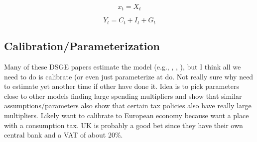 \documentclass[article,11pt,letterpaper,fleqn]{article}
\theoremstyle{definition}
\numberwithin{equation}{section}
\newcommand{\cn}{\citeasnoun} %
\begin{document}
{\begin{equation}\label{TAppEqMarkClrX}
   x_t = X_t
\end{equation}

\begin{equation}\label{TAppEqMarkClrResConst}
   Y_t = C_t + I_t + G_t
\end{equation}


\subsection{Calibration/Parameterization}

Many of these DSGE papers estimate the model (e.g., \cn{TY2010}, \cn{Zubairy2010}, \cn{SW2003}), but I think all we need to do is calibrate (or even just parameterize at \cn{CER2010} do.  Not really sure why need to estimate yet another time if other have done it.  Idea is to pick parameters close to other models finding large spending multipliers and show that similar assumptions/parameters also show that certain tax policies also have really large multipliers.  Likely want to calibrate to European economy because want a place with a consumption tax.  UK is probably a good bet since they have their own central bank and a VAT of about 20\%.

}
\end{document}
